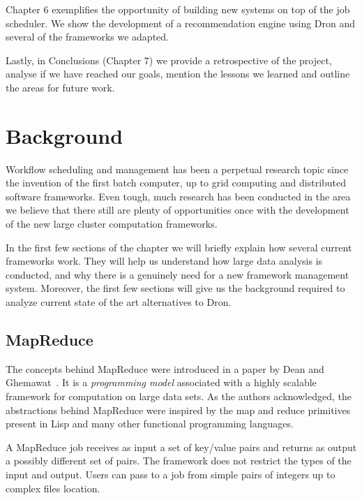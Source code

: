 \documentclass[11pt,a4paper,twoside]{report}
\begin{document}
Chapter 6 exemplifies the opportunity of building new systems on top of the job scheduler. We show the development of a recommendation engine using Dron and several of the frameworks we adapted.


Lastly, in Conclusions (Chapter 7) we provide a retrospective of the project, analyse if we have reached our goals, mention the lessons we learned and outline the areas for future work.

\chapter{Background}
Workflow scheduling and management has been a perpetual research topic since the invention of the first batch computer, up to grid computing and distributed software frameworks. Even tough, much research has been conducted in the area we believe that there still are plenty of opportunities once with the development of the new large cluster computation frameworks.


In the first few sections of the chapter we will briefly explain how several current frameworks work. They will help us understand how large data analysis is conducted, and why there is a genuinely need for a new framework management system. Moreover, the first few sections will give us the background required to analyze current state of the art alternatives to Dron.

\section{MapReduce}
\label{sec:MapReduce}
The concepts behind MapReduce were introduced in a paper by Dean and Ghemawat~\cite{MapReduce}. It is a \textit{programming model} associated with a highly scalable framework for computation on large data sets. As the authors acknowledged, the abstractions behind MapReduce were inspired by the map and reduce primitives present in Lisp and many other functional programming languages.


A MapReduce job receives as input a set of key/value pairs and returns as output a possibly different set of pairs. The framework does not restrict the types of the input and output. Users can pass to a job from simple pairs of integers up to complex files location.
\end{document}
